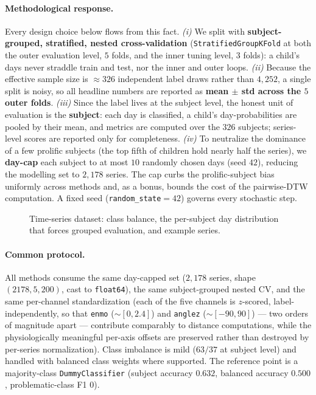 \paragraph{Methodological response.} Every design choice below flows from this fact. \emph{(i)} We split with \textbf{subject-grouped, stratified, nested cross-validation} (\texttt{StratifiedGroupKFold} at both the outer evaluation level, $5$ folds, and the inner tuning level, $3$ folds): a child's days never straddle train and test, nor the inner and outer loops. \emph{(ii)} Because the effective sample size is $\approx 326$ independent label draws rather than $4{,}252$, a single split is noisy, so all headline numbers are reported as \textbf{mean $\pm$ std across the $5$ outer folds}. \emph{(iii)} Since the label lives at the subject level, the honest unit of evaluation is the \textbf{subject}: each day is classified, a child's day-probabilities are pooled by their mean, and metrics are computed over the $326$ subjects; series-level scores are reported only for completeness. \emph{(iv)} To neutralize the dominance of a few prolific subjects (the top fifth of children hold nearly half the series), we \textbf{day-cap} each subject to at most $10$ randomly chosen days (seed $42$), reducing the modelling set to $2{,}178$ series. The cap curbs the prolific-subject bias uniformly across methods and, as a bonus, bounds the cost of the pairwise-DTW computation. A fixed seed (\texttt{random\_state}$=42$) governs every stochastic step.

\begin{figure}[h]
    \centering
    \caption{Time-series dataset: class balance, the per-subject day distribution that forces grouped evaluation, and example series.}
    \label{fig:ts_data}
\end{figure}

\paragraph{Common protocol.} All methods consume the same day-capped set ($2{,}178$ series, shape $(2178, 5, 200)$, cast to \texttt{float64}), the same subject-grouped nested CV, and the same per-channel standardization (each of the five channels is $z$-scored, label-independently, so that \texttt{enmo} ($\sim[0,2.4]$) and \texttt{anglez} ($\sim[-90,90]$) --- two orders of magnitude apart --- contribute comparably to distance computations, while the physiologically meaningful per-axis offsets are preserved rather than destroyed by per-series normalization). Class imbalance is mild ($63/37$ at subject level) and handled with balanced class weights where supported. The reference point is a majority-class \texttt{DummyClassifier} (subject accuracy $0.632$, balanced accuracy $0.500$, problematic-class F1 $0$).


